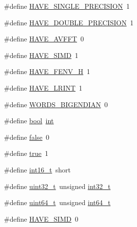 \begin{DoxyCompactItemize}
\item 
\#define \hyperlink{mac_2config_2i386_2lib-src_2libsoxr_2soxr-config_8h_a7d5257b242a6369603f16dca5e23969a}{H\+A\+V\+E\+\_\+\+S\+I\+N\+G\+L\+E\+\_\+\+P\+R\+E\+C\+I\+S\+I\+ON}~1
\item 
\#define \hyperlink{mac_2config_2i386_2lib-src_2libsoxr_2soxr-config_8h_a95431831c0c6db38c5cff6de1850b117}{H\+A\+V\+E\+\_\+\+D\+O\+U\+B\+L\+E\+\_\+\+P\+R\+E\+C\+I\+S\+I\+ON}~1
\item 
\#define \hyperlink{mac_2config_2i386_2lib-src_2libsoxr_2soxr-config_8h_a126b1684b376fc1fd71e169a46bcb3da}{H\+A\+V\+E\+\_\+\+A\+V\+F\+FT}~0
\item 
\#define \hyperlink{mac_2config_2i386_2lib-src_2libsoxr_2soxr-config_8h_a0b8fb21213538acb85ca7075fbc8cea3}{H\+A\+V\+E\+\_\+\+S\+I\+MD}~1
\item 
\#define \hyperlink{mac_2config_2i386_2lib-src_2libsoxr_2soxr-config_8h_a252d609defabf0144cfb8556051c2689}{H\+A\+V\+E\+\_\+\+F\+E\+N\+V\+\_\+H}~1
\item 
\#define \hyperlink{mac_2config_2i386_2lib-src_2libsoxr_2soxr-config_8h_a2bc3bc313571661387f686459daa7869}{H\+A\+V\+E\+\_\+\+L\+R\+I\+NT}~1
\item 
\#define \hyperlink{mac_2config_2i386_2lib-src_2libsoxr_2soxr-config_8h_a82e69009d3cd108c8aad8afe44fb1132}{W\+O\+R\+D\+S\+\_\+\+B\+I\+G\+E\+N\+D\+I\+AN}~0
\item 
\#define \hyperlink{mac_2config_2i386_2lib-src_2libsoxr_2soxr-config_8h_abb452686968e48b67397da5f97445f5b}{bool}~\hyperlink{xmltok_8h_a5a0d4a5641ce434f1d23533f2b2e6653}{int}
\item 
\#define \hyperlink{mac_2config_2i386_2lib-src_2libsoxr_2soxr-config_8h_a65e9886d74aaee76545e83dd09011727}{false}~0
\item 
\#define \hyperlink{mac_2config_2i386_2lib-src_2libsoxr_2soxr-config_8h_a41f9c5fb8b08eb5dc3edce4dcb37fee7}{true}~1
\item 
\#define \hyperlink{mac_2config_2i386_2lib-src_2libsoxr_2soxr-config_8h_aba47ebc2ca6caf60d3de4971843aa4cf}{int16\+\_\+t}~short
\item 
\#define \hyperlink{mac_2config_2i386_2lib-src_2libsoxr_2soxr-config_8h_a0ddb3f43e52282b59ee55d059ed74a28}{uint32\+\_\+t}~unsigned \hyperlink{lib-src_2ffmpeg_2win32_2stdint_8h_a37994e3b11c72957c6f454c6ec96d43d}{int32\+\_\+t}
\item 
\#define \hyperlink{mac_2config_2i386_2lib-src_2libsoxr_2soxr-config_8h_a104204cb123abb831baa5adcfffc64e0}{uint64\+\_\+t}~unsigned \hyperlink{lib-src_2ffmpeg_2win32_2stdint_8h_a67a9885ef4908cb72ce26d75b694386c}{int64\+\_\+t}
\item 
\#define \hyperlink{mac_2config_2i386_2lib-src_2libsoxr_2soxr-config_8h_a0b8fb21213538acb85ca7075fbc8cea3}{H\+A\+V\+E\+\_\+\+S\+I\+MD}~0
\end{DoxyCompactItemize}


